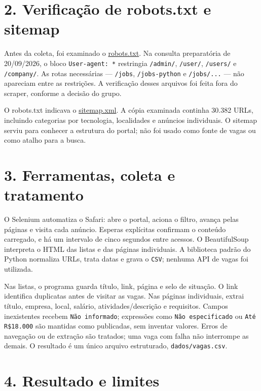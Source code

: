 \documentclass[10pt,a4paper]{article}
\begin{document}
\section*{2. Verificação de robots.txt e sitemap}

Antes da coleta, foi examinado o \href{https://programathor.com.br/robots.txt}{robots.txt}. Na consulta preparatória de 20/09/2026, o bloco \texttt{User-agent: *} restringia \texttt{/admin/}, \texttt{/user/}, \texttt{/users/} e \texttt{/company/}. As rotas necessárias --- \texttt{/jobs}, \texttt{/jobs-python} e \texttt{/jobs/...} --- não apareciam entre as restrições. A verificação desses arquivos foi feita fora do scraper, conforme a decisão do grupo.

O robots.txt indicava o \href{https://programathor.com.br/sitemap.xml}{sitemap.xml}. A cópia examinada continha 30.382 URLs, incluindo categorias por tecnologia, localidades e anúncios individuais. O sitemap serviu para conhecer a estrutura do portal; não foi usado como fonte de vagas ou como atalho para a busca.

\section*{3. Ferramentas, coleta e tratamento}

O Selenium automatiza o Safari: abre o portal, aciona o filtro, avança pelas páginas e visita cada anúncio. Esperas explícitas confirmam o conteúdo carregado, e há um intervalo de cinco segundos entre acessos. O BeautifulSoup interpreta o HTML das listas e das páginas individuais. A biblioteca padrão do Python normaliza URLs, trata datas e grava o \texttt{CSV}; nenhuma API de vagas foi utilizada.

Nas listas, o programa guarda título, link, página e selo de situação. O link identifica duplicatas antes de visitar as vagas. Nas páginas individuais, extrai título, empresa, local, salário, atividades/descrição e requisitos. Campos inexistentes recebem \texttt{Não informado}; expressões como \texttt{Não especificado} ou \texttt{Até R\$18.000} são mantidas como publicadas, sem inventar valores. Erros de navegação ou de extração são tratados; uma vaga com falha não interrompe as demais. O resultado é um único arquivo estruturado, \texttt{dados/vagas.csv}.

\section*{4. Resultado e limites}
\end{document}
